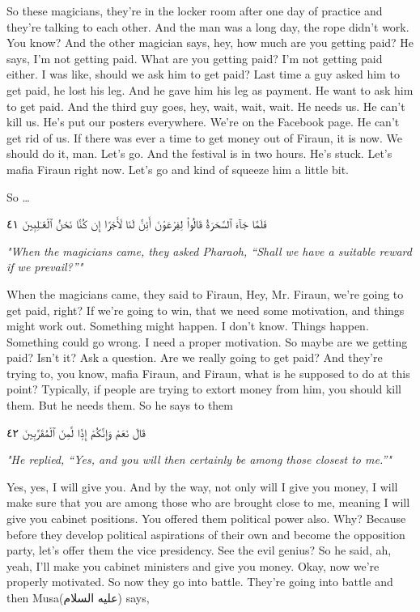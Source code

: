\documentclass[12pt]{article}
\newcommand{\as}{\textarabic{(عليه السلام)}}
\begin{document}
So these magicians, they're in the locker room after one day of practice and they're talking to each other. And the man was a long day, the rope didn't work. You know? And the other magician says, hey, how much are you getting paid? He says, I'm not getting paid. What are you getting paid? I'm not getting paid either. I was like, should we ask him to get paid? Last time a guy asked him to get paid, he lost his leg. And he gave him his leg as payment. He want to ask him to get paid. And the third guy goes, hey, wait, wait, wait. He needs us. He can't kill us. He's put our posters everywhere. We're on the Facebook page. He can't get rid of us. If there was ever a time to get money out of Firaun, it is now. We should do it, man. Let's go. And the festival is in two hours. He's stuck. Let's mafia Firaun right now. Let's go and kind of squeeze him a little bit. 

So \dots

\textarabic{فَلَمَّا جَآءَ ٱلسَّحَرَةُ قَالُوا۟ لِفِرْعَوْنَ أَئِنَّ لَنَا لَأَجْرًا إِن كُنَّا نَحْنُ ٱلْغَـٰلِبِينَ ٤١} 

\textit{"When the magicians came, they asked Pharaoh, “Shall we have a suitable reward if we prevail?”"}

When the magicians came, they said to Firaun, Hey, Mr. Firaun, we're going to get paid, right? If we're going to win, that we need some motivation, and things might work out. Something might happen. I don't know. Things happen. Something could go wrong. I need a proper motivation. So maybe are we getting paid? Isn't it? Ask a question. Are we really going to get paid? And they're trying to, you know, mafia Firaun, and Firaun, what is he supposed to do at this point? Typically, if people are trying to extort money from him, you should kill them. But he needs them. So he says to them 

\textarabic{قَالَ نَعَمْ وَإِنَّكُمْ إِذًۭا لَّمِنَ ٱلْمُقَرَّبِينَ ٤٢}

\textit{"He replied, “Yes, and you will then certainly be among those closest to me.”"}

Yes, yes, I will give you. And by the way, not only will I give you money, I will make sure that you are among those who are brought close to me, meaning I will give you cabinet positions. You offered them political power also. Why? Because before they develop political aspirations of their own and become the opposition party, let's offer them the vice presidency. See the evil genius? So he said, ah, yeah, I'll make you cabinet ministers and give you money. Okay, now we're properly motivated. So now they go into battle. They're going into battle and then Musa\as{} says, 
\end{document}
